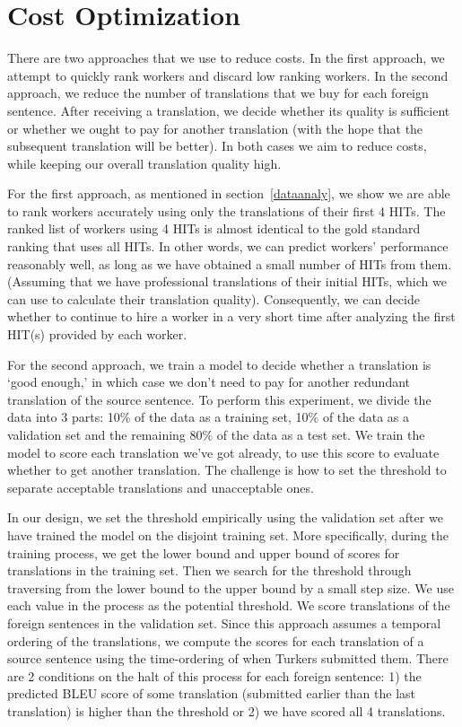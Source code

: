 \documentclass[11pt]{article}
\begin{document}
\section{Cost Optimization}

There are two approaches that we use to reduce costs. In the first approach, we attempt to quickly rank workers and discard low ranking workers. In the second approach, we reduce the number of translations that we buy for each foreign sentence. After receiving a translation, we decide whether its quality is sufficient or whether we ought to pay for another translation (with the hope that the subsequent translation will be better).  In both cases we aim to reduce costs, while keeping our overall translation quality high.
 
 For the first approach, as mentioned in section~\ref{dataanaly}, we show we are able to rank workers accurately using only the translations of their first 4 HITs.  The ranked list of workers using 4 HITs is  almost identical to the gold standard ranking that uses all HITs. In other words, we can predict workers' performance reasonably well, as long as we have obtained a small number of HITs from them.  (Assuming that we have professional translations of their initial HITs, which we can use to calculate their translation quality). Consequently, we can decide whether to continue to hire a worker in a very short time after analyzing the first HIT(s) provided by each worker.
 
 For the second approach,  we train a model to decide whether a translation  is `good enough,' in which case we don't need to  pay for another redundant translation of the source sentence.  To perform this experiment, we divide the data into 3 parts: 10$\%$ of the data as a training set, 10$\%$ of the data as a validation set and the remaining 80$\%$ of the data as a test set. We train the model to score each translation we've got already, to use this score to evaluate whether to get another translation. The challenge is how to set the threshold to separate acceptable translations and unacceptable ones. 
 
 
 In our design, we set the threshold empirically using the validation set after we have trained the model on the disjoint training set. More specifically, during the training process, we get the lower bound and upper bound of scores for translations in the training set. Then we search for the threshold through traversing from the lower bound to the upper bound by a small step size. %
 We use each value  in the process  as the potential threshold.  We score translations of the foreign sentences in the validation set.  Since this approach assumes a temporal ordering of the translations, we compute the scores for each translation of a source sentence using the time-ordering of when Turkers submitted them. There are 2 conditions on the halt of this process for each foreign sentence: 1) the predicted BLEU score of some translation (submitted earlier than the last translation) is higher than the threshold or 2) we have scored all 4 translations.  
\end{document}
